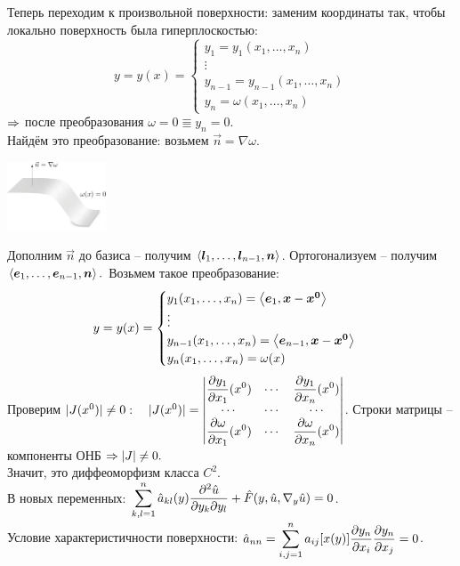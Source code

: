 \documentclass[../main.tex]{subfiles}
\begin{document}
Теперь переходим к произвольной поверхности: заменим координаты так, чтобы локально поверхность была гиперплоскостью:
\[y = y(x) = \begin{cases} y_1 = y_1(x_1,\dots, x_n) \\ \vdots \\ y_{n-1} = y_{n-1}(x_1,\dots,x_n) \\ y_n = \omega(x_1,\dots,x_n) \end{cases} \]
$\Rightarrow$ после преобразования $\omega=0 \Equiv y_n=0$.\\
Найдём это преобразование: возьмем $\vec{n} = \nabla \omega$.
\begin{center}
\includegraphics[width=0.22\textwidth]{./pic 2_1.pdf}
\end{center}
Дополним $\vec{n}$ до базиса -- получим $\left\langle \boldsymbol{l}_1,\dots,\boldsymbol{l}_{n-1},\boldsymbol{n} \right\rangle$. Ортогонализуем -- получим $\left\langle \boldsymbol{e}_1,\dots,\boldsymbol{e}_{n-1},\boldsymbol{n} \right\rangle.$ Возьмем такое преобразование:
\[ y = y(x) = \begin{cases} y_1(x_1,\dots,x_n) = \left\langle \boldsymbol{e}_1, \boldsymbol{x}-\boldsymbol{x^0} \right\rangle \\ \vdots \\ y_{n-1}(x_1,\dots,x_n) = \left\langle \boldsymbol{e}_{n-1}, \boldsymbol{x}-\boldsymbol{x^0} \right\rangle \\ y_n(x_1,\dots,x_n) = \omega(x) \end{cases}\]
Проверим $|J(x^0)|\not=0: \quad |J(x^0)| = 
\begin{vmatrix} 
\displaystyle\frac{\partial y_1}{\partial x_1}(x^0) & \cdots & \displaystyle\frac{\partial y_1}{\partial x_n}(x^0) \\
\cdots &\cdots &\cdots \\
\displaystyle\frac{\partial \omega}{\partial x_1}(x^0) & \cdots & \displaystyle\frac{\partial \omega}{\partial x_n}(x^0) \\
\end{vmatrix} $. Строки матрицы -- компоненты ОНБ $\Rightarrow |J|\not= 0.$\\
Значит, это диффеоморфизм класса $C^2$.\\
В новых переменных: $\displaystyle\sum\limits_{k,l=1}^{n}\hat{a}_{kl}(y)\displaystyle\frac{\partial^2 \hat{u}}{\partial y_k\partial y_l} + \hat{F}(y, \hat{u}, \nabla_y \hat{u}) = 0 $.\\
Условие характеристичности поверхности: $\hat{a}_{nn} = \displaystyle\sum\limits_{i,j=1}^{n} a_{ij}[x(y)]\displaystyle\frac{\partial y_n}{\partial x_i}\displaystyle\frac{\partial y_n}{\partial x_j} = 0$.
\end{document}
